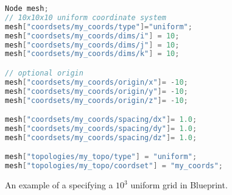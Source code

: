 \begin{figure}
\begin{lstlisting}[language=C++]
Node mesh;
// 10x10x10 uniform coordinate system
mesh["coordsets/my_coords/type"]="uniform";
mesh["coordsets/my_coords/dims/i"] = 10;
mesh["coordsets/my_coords/dims/j"] = 10;
mesh["coordsets/my_coords/dims/k"] = 10;

// optional origin
mesh["coordsets/my_coords/origin/x"]= -10;
mesh["coordsets/my_coords/origin/y"]= -10;
mesh["coordsets/my_coords/origin/z"]= -10;

mesh["coordsets/my_coords/spacing/dx"]= 1.0;
mesh["coordsets/my_coords/spacing/dy"]= 1.0;
mesh["coordsets/my_coords/spacing/dz"]= 1.0;

mesh["topologies/my_topo/type"] = "uniform";
mesh["topologies/my_topo/coordset"] = "my_coords";
\end{lstlisting}
\caption{\label{ex:blueprint}An example of a specifying a $10^3$ uniform grid in Blueprint.}
\end{figure}

